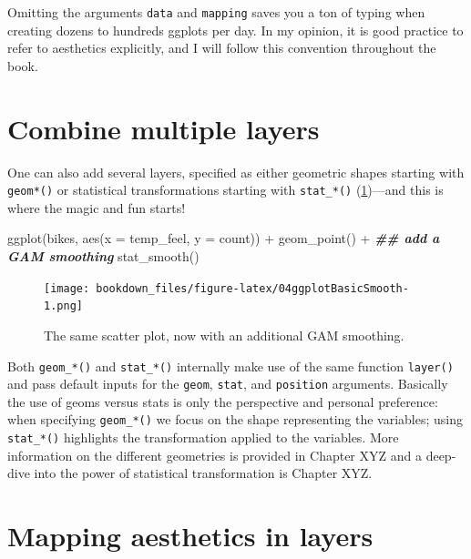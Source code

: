 \documentclass[
]{krantz}
\makeatletter
\newenvironment{Shaded}{\begin{snugshade}}{\end{snugshade}}
\newcommand{\AttributeTok}[1]{\textcolor[rgb]{0.61,0.61,0.61}{#1}}
\newcommand{\DocumentationTok}[1]{\textcolor[rgb]{0.37,0.37,0.37}{\textbf{\textit{#1}}}}
\newcommand{\FunctionTok}[1]{\textcolor[rgb]{0,0,0}{#1}}
\newcommand{\NormalTok}[1]{#1}
\newcommand{\SpecialCharTok}[1]{\textcolor[rgb]{0,0,0}{#1}}
\newenvironment{kframe}{%
\medskip{}
\setlength{\fboxsep}{.8em}
 \def\at@end@of@kframe{}%
 \ifinner\ifhmode%
  \def\at@end@of@kframe{\end{minipage}}%
  \begin{minipage}{\columnwidth}%
 \fi\fi%
 \def\FrameCommand##1{\hskip\@totalleftmargin \hskip-\fboxsep
 \colorbox{shadecolor}{##1}\hskip-\fboxsep
     \hskip-\linewidth \hskip-\@totalleftmargin \hskip\columnwidth}%
 \MakeFramed {\advance\hsize-\width
   \@totalleftmargin\z@ \linewidth\hsize
   \@setminipage}}%
 {\par\unskip\endMakeFramed%
 \at@end@of@kframe}
\renewenvironment{Shaded}{\begin{kframe}}{\end{kframe}}
\makeatother
\begin{document}
Omitting the arguments \texttt{data} and \texttt{mapping} saves you a ton of typing when creating dozens to hundreds ggplots per day. In my opinion, it is good practice to refer to aesthetics explicitly, and I will follow this convention throughout the book.

\hypertarget{combined-layers}{%
\section{Combine multiple layers}\label{combined-layers}}

One can also add several layers, specified as either geometric shapes starting with \texttt{geom*()} or statistical transformations starting with \texttt{stat\_*()} (\ref{fig:04ggplotBasicSmooth})---and this is where the magic and fun starts!

\begin{Shaded}
\begin{Highlighting}[]
\FunctionTok{ggplot}\NormalTok{(bikes, }\FunctionTok{aes}\NormalTok{(}\AttributeTok{x =}\NormalTok{ temp\_feel, }\AttributeTok{y =}\NormalTok{ count)) }\SpecialCharTok{+} 
  \FunctionTok{geom\_point}\NormalTok{() }\SpecialCharTok{+} 
  \DocumentationTok{\#\# add a GAM smoothing}
  \FunctionTok{stat\_smooth}\NormalTok{()}
\end{Highlighting}
\end{Shaded}

\begin{figure}
\centering
\texttt{[image: bookdown\_files/figure-latex/04ggplotBasicSmooth-1.png]}
\caption{\label{fig:04ggplotBasicSmooth}The same scatter plot, now with an additional GAM smoothing.}
\end{figure}

Both \texttt{geom\_*()} and \texttt{stat\_*()} internally make use of the same function \texttt{layer()} and pass default inputs for the \texttt{geom}, \texttt{stat}, and \texttt{position} arguments. Basically the use of geoms versus stats is only the perspective and personal preference: when specifying \texttt{geom\_*()} we focus on the shape representing the variables; using \texttt{stat\_*()} highlights the transformation applied to the variables. More information on the different geometries is provided in Chapter XYZ and a deep-dive into the power of statistical transformation is Chapter XYZ.

\hypertarget{map-aesthetics}{%
\section{Mapping aesthetics in layers}\label{map-aesthetics}}
\end{document}
